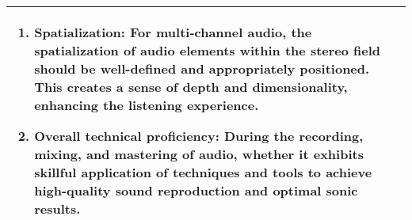\begin{table*}[ht]
\begin{tabular}{p{15cm}}
\begin{enumerate}[leftmargin=.75cm]
    \item \textbf{Spatialization}: For multi-channel audio, the spatialization of audio elements within the stereo field should be well-defined and appropriately positioned. This creates a sense of depth and dimensionality, enhancing the listening experience.
    \item \textbf{Overall technical proficiency}: During the recording, mixing, and mastering of audio, whether it exhibits skillful application of techniques and tools to achieve high-quality sound reproduction and optimal sonic results.
\end{enumerate}\\


\bottomrule\bottomrule
\end{tabular}
\end{table*}

